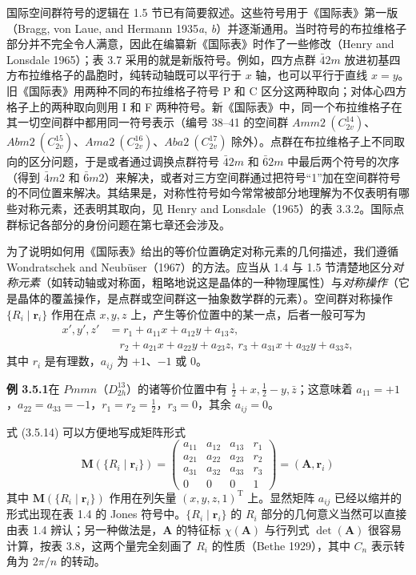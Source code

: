 国际空间群符号的逻辑在 1.5 节已有简要叙述。这些符号用于《国际表》第一版（Bragg, von Laue, and Hermann 1935\textit{a}, \textit{b}）并逐渐通用。当时符号的布拉维格子部分并不完全令人满意，因此在编纂新《国际表》时作了一些修改（Henry and Lonsdale 1965）；表 3.7 采用的就是新版符号。例如，四方点群 $\bar{4}2m$ 放进初基四方布拉维格子的晶胞时，纯转动轴既可以平行于 $x$ 轴，也可以平行于直线 $x = y$。旧《国际表》用两种不同的布拉维格子符号 P 和 C 区分这两种取向；对体心四方格子上的两种取向则用 I 和 F 两种符号。新《国际表》中，同一个布拉维格子在其一切空间群中都用同一符号表示（编号 38--41 的空间群 $Amm2\ (C_{2v}^{14})$、$Abm2\ (C_{2v}^{15})$、$Ama2\ (C_{2v}^{16})$、$Aba2\ (C_{2v}^{17})$ 除外）。点群在布拉维格子上不同取向的区分问题，于是或者通过调换点群符号 $\bar{4}2m$ 和 $\bar{6}2m$ 中最后两个符号的次序（得到 $\bar{4}m2$ 和 $\bar{6}m2$）来解决，或者对三方空间群通过把符号“1”加在空间群符号的不同位置来解决。其结果是，对称性符号如今常常被部分地理解为不仅表明有哪些对称元素，还表明其取向，见 Henry and Lonsdale（1965）的表 3.3.2。国际点群标记各部分的身份问题在第七章还会涉及。

为了说明如何用《国际表》给出的等价位置确定对称元素的几何描述，我们遵循 Wondratschek and Neubüser（1967）的方法。应当从 1.4 与 1.5 节清楚地区分\textit{对称元素}（如转动轴或对称面，粗略地说这是晶体的一种物理属性）与\textit{对称操作}（它是晶体的覆盖操作，是点群或空间群这一抽象数学群的元素）。空间群对称操作 $\{R_{i} \mid \mathbf{r}_{i}\}$ 作用在点 $x, y, z$ 上，产生等价位置中的某一点，后者一般可写为
\begin{equation*}
\begin{aligned}
x', y', z' &= r_{1} + a_{11}x + a_{12}y + a_{13}z,\\
&\quad r_{2} + a_{21}x + a_{22}y + a_{23}z,\ r_{3} + a_{31}x + a_{32}y + a_{33}z,
\end{aligned}
\tag{3.5.14}
\end{equation*}
其中 $r_{i}$ 是有理数，$a_{ij}$ 为 $+1$、$-1$ 或 0。

\noindent\textbf{例 3.5.1}\quad 在 $Pmmn$（$D_{2h}^{13}$）的诸等价位置中有 $\frac{1}{2}+x, \frac{1}{2}-y, \bar{z}$；这意味着 $a_{11} = +1$，$a_{22} = a_{33} = -1$，$r_{1} = r_{2} = \frac{1}{2}$，$r_{3} = 0$，其余 $a_{ij} = 0$。

式 (3.5.14) 可以方便地写成矩阵形式
\begin{equation*}
\mathbf{M}\left(\{R_{i} \mid \mathbf{r}_{i}\}\right) = \begin{pmatrix} a_{11} & a_{12} & a_{13} & r_{1}\\ a_{21} & a_{22} & a_{23} & r_{2}\\ a_{31} & a_{32} & a_{33} & r_{3}\\ 0 & 0 & 0 & 1 \end{pmatrix} = (\mathbf{A}, \mathbf{r}_{i})
\tag{3.5.15}
\end{equation*}
其中 $\mathbf{M}(\{R_{i} \mid \mathbf{r}_{i}\})$ 作用在列矢量 $(x, y, z, 1)^{\mathrm{T}}$ 上。显然矩阵 $a_{ij}$ 已经以缩并的形式出现在表 1.4 的 Jones 符号中。$\{R_{i} \mid \mathbf{r}_{i}\}$ 的 $R_{i}$ 部分的几何意义当然可以直接由表 1.4 辨认；另一种做法是，$\mathbf{A}$ 的特征标 $\chi(\mathbf{A})$ 与行列式 $\det(\mathbf{A})$ 很容易计算，按表 3.8，这两个量完全刻画了 $R_{i}$ 的性质（Bethe 1929），其中 $C_{n}$ 表示转角为 $2\pi/n$ 的转动。

